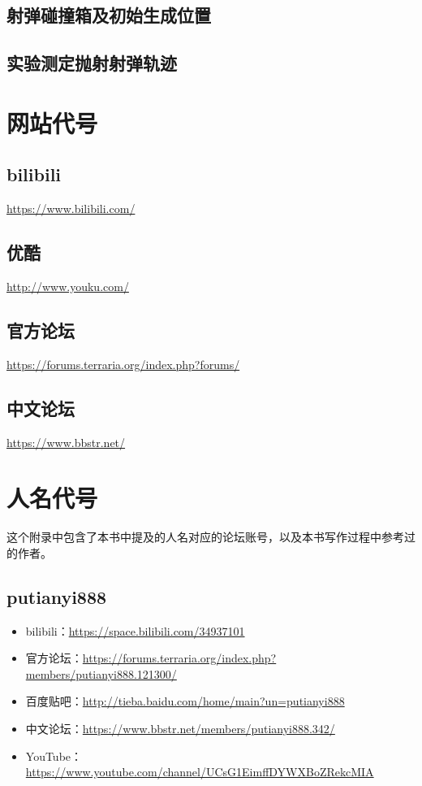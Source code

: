 \section{射弹碰撞箱及初始生成位置}

\section{实验测定抛射射弹轨迹}

\chapter{网站代号}
\section{bilibili}
\url{https://www.bilibili.com/}
\section{优酷}
\url{http://www.youku.com/}
\section{官方论坛}
\url{https://forums.terraria.org/index.php?forums/}
\section{中文论坛}
\url{https://www.bbstr.net/}

\chapter{人名代号}
这个附录中包含了本书中提及的人名对应的论坛账号，以及本书写作过程中参考过的作者。
\section{putianyi888}
\begin{itemize}
\item bilibili：\url{https://space.bilibili.com/34937101}
\item 官方论坛：\url{https://forums.terraria.org/index.php?members/putianyi888.121300/}
\item 百度贴吧：\url{http://tieba.baidu.com/home/main?un=putianyi888}
\item 中文论坛：\url{https://www.bbstr.net/members/putianyi888.342/}
\item YouTube：\url{https://www.youtube.com/channel/UCsG1EimffDYWXBoZRekcMIA}
\end{itemize}
